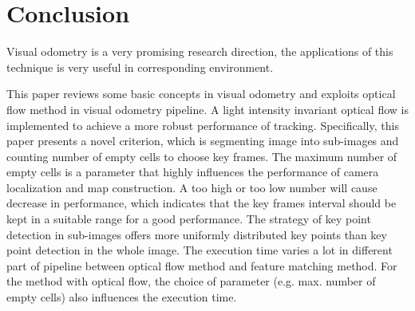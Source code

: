 \documentclass[11pt]{easychair}
\begin{document}
\section{Conclusion}
Visual odometry is a very promising research direction, the applications of this technique is very useful in corresponding environment.

This paper reviews some basic concepts in visual odometry and exploits optical flow method in visual odometry pipeline. A light intensity invariant optical flow is implemented to achieve a more robust performance of tracking. Specifically, this paper presents a novel criterion, which is segmenting image into sub-images and counting number of empty cells to choose key frames. The maximum number of empty cells is a parameter that highly influences the performance of camera localization and map construction. A too high or too low number will cause decrease in performance, which indicates that the key frames interval should be kept in a suitable range for a good performance. The strategy of key point detection in sub-images offers more uniformly distributed key points than key point detection in the whole image. The execution time varies a lot in different part of pipeline between optical flow method and feature matching method. For the method with optical flow, the choice of parameter (e.g. max. number of empty cells) also influences the execution time.
\end{document}
